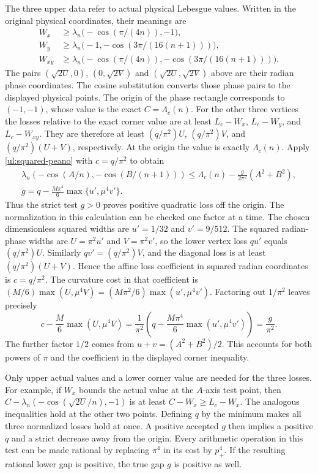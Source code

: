 The three upper data refer to actual physical Lebesgue values.
Written in the original physical coordinates, their meanings are
\[
 \begin{aligned}
 W_x&\geq\lambda_n\bigl(-\cos(\pi/(4n)),-1\bigr),\\
 W_y&\geq\lambda_n\bigl(-1,-\cos(3\pi/(16(n+1)))\bigr),\\
 W_{xy}&\geq\lambda_n\bigl(-\cos(\pi/(4n)),
                            -\cos(3\pi/(16(n+1)))\bigr).
 \end{aligned}
\]
The pairs $(\sqrt{2U},0)$, $(0,\sqrt{2V})$ and
$(\sqrt{2U},\sqrt{2V})$ above are their radian phase coordinates.
The cosine substitution converts those phase pairs to the displayed
physical points. The origin of the phase rectangle corresponds to
$(-1,-1)$, whose value is the exact $C=\Lambda_c(n)$.
For the other three vertices the losses relative to the exact corner
value are at least $L_c-W_x$, $L_c-W_y$, and $L_c-W_{xy}$.
They are therefore at least $(q/\pi^2)U$, $(q/\pi^2)V$, and
$(q/\pi^2)(U+V)$, respectively. At the origin the value is exactly
$\Lambda_c(n)$. Apply \eqref{ul:squared-peano} with $c=q/\pi^2$
to obtain
\[
 \begin{gathered}
 \lambda_n(-\cos(A/n),-\cos(B/(n+1)))
 \leq\Lambda_c(n)-\frac{g}{2\pi^2}(A^2+B^2),\\
 g=q-\frac{M\pi^4}{6}\max\{u',\mu^4v'\}.
 \end{gathered}
\]
Thus the strict test $g>0$ proves positive quadratic loss off the
origin.
The normalization in this calculation can be checked one factor at a
time. The chosen dimensionless squared widths are
$u'=1/32$ and $v'=9/512$. The squared radian-phase widths are
$U=\pi^2u'$ and $V=\pi^2v'$, so the lower vertex loss
$q u'$ equals $(q/\pi^2)U$. Similarly $qv'=(q/\pi^2)V$, and
the diagonal loss is at least $(q/\pi^2)(U+V)$. Hence the affine
loss coefficient in squared radian coordinates is $c=q/\pi^2$.
The curvature cost in that coefficient is
$(M/6)\max(U,\mu^4V)=(M\pi^2/6)\max(u',\mu^4v')$.
Factoring out $1/\pi^2$ leaves precisely
\[
 c-\frac M6\max(U,\mu^4V)
   =\frac1{\pi^2}
       \left(q-\frac{M\pi^4}{6}\max(u',\mu^4v')\right)
   =\frac g{\pi^2}.
\]
The further factor $1/2$ comes from $u+v=(A^2+B^2)/2$.
This accounts for both powers of $\pi$ and the coefficient in the
displayed corner inequality.

Only upper actual values and a lower corner value are needed for
the three losses. For example, if $W_x$ bounds the actual value at
the $A$-axis test point, then
$C-\lambda_n(-\cos(\sqrt{2U}/n),-1)$ is at least
$C-W_x\geq L_c-W_x$. The analogous inequalities hold at the
other two points. Defining $q$ by the minimum makes all three
normalized losses hold at once. A positive accepted $g$ then implies
a positive $q$ and a strict decrease away from the origin. Every
arithmetic operation in this test can be made rational by replacing
$\pi^4$ in its cost by $p_+^4$. If the resulting rational lower
gap is positive, the true gap $g$ is positive as well.

